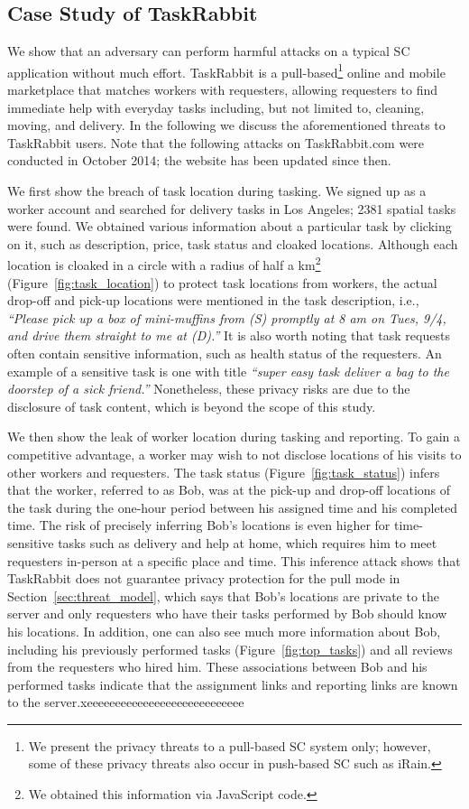 \documentclass{USC-Thesis}
\numberwithin{equation}{chapter}
\begin{document}
\subsection{Case Study of TaskRabbit}
\label{sec:tasktabbit}
We show that an adversary can perform harmful attacks on a typical SC application without much effort. TaskRabbit is a pull-based\footnote{We present the privacy threats to a pull-based SC system only; however, some of these privacy threats also occur in push-based SC such as iRain.} online and mobile marketplace that matches workers with requesters, allowing requesters to find immediate help with everyday tasks including, but not limited to, cleaning, moving, and delivery. In the following we discuss the aforementioned threats to TaskRabbit  users. Note that the following attacks on TaskRabbit.com were conducted in October 2014; the website has been updated since then.

We first show the breach of task location during tasking. 
We signed up as a worker account and searched for delivery tasks in Los Angeles; 2381 spatial tasks were found. We obtained various information about a particular task by clicking on it, such as description, price, task status and cloaked locations. Although each location is cloaked in a circle with a radius of half a km\footnote{We obtained this information via JavaScript code.} (Figure~\ref{fig:task_location}) to protect task locations from workers, the actual drop-off and pick-up locations were mentioned in the task description, i.e., \emph{``Please pick up a box of mini-muffins from (S) promptly at 8 am on Tues, 9/4, and drive them straight to me at (D).''}
It is also worth noting that task requests often contain sensitive information, such as health status of the requesters. An example of a sensitive task is one with title \emph{``super easy task deliver a bag to the doorstep of a sick friend.''}
Nonetheless, these privacy risks are due to the disclosure of task content, which is beyond the scope of this study.

We then show the leak of worker location during tasking and reporting. To gain a competitive advantage, a worker may wish to not disclose locations of his visits to other workers and requesters.
The task status (Figure~\ref{fig:task_status}) infers that the worker, referred to as Bob, was at the pick-up and drop-off locations of the task during the one-hour period between his assigned time and his completed time. The risk of precisely inferring Bob's locations is even higher for time-sensitive tasks such as delivery and help at home, which requires him to meet requesters in-person at a specific place and time. This inference attack shows that TaskRabbit does not guarantee privacy protection for the pull mode in Section~\ref{sec:threat_model}, which says that Bob's locations are private to the server and only requesters who have their tasks performed by Bob should know his locations.
In addition, one can also see much more information about Bob, including his previously performed tasks (Figure~\ref{fig:top_tasks}) and all reviews from the requesters who hired him. These associations between Bob and his performed tasks indicate that the assignment links and reporting links are known to the server.xeeeeeeeeeeeeeeeeeeeeeeeeeeee
\end{document}
